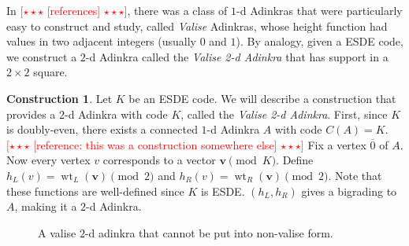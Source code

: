 \documentclass[12pt,twoside,singlespace]{article}
\numberwithin{equation}{section}
\theoremstyle{definition}
\newtheorem{construction}[equation]{Construction}
\newcommand{\on}{\operatorname}
\newcommand{\wt}{\on{wt}}
\newcommand{\com}[1]{\textcolor{red}{$[\star \star \star$ #1 $\star \star \star]$}}
\renewcommand{\vec}[1]{\mathbf{#1}}
\begin{document}
In \com{[references]}, there was a class of $1$-d Adinkras that were particularly easy to construct and study, called {\em Valise} Adinkras, whose height function had values in two adjacent integers (usually $0$ and $1$).  By analogy, given a ESDE code, we construct a $2$-d Adinkra called the {\em Valise 2-d Adinkra} that has support in a $2\times 2$ square.


\begin{construction}
\label{cons:valise}
Let $K$ be an ESDE code.  We will describe a construction that provides a $2$-d Adinkra with code $K$, called the {\em Valise 2-d Adinkra}. First, since $K$ is doubly-even, there exists a connected $1$-d Adinkra $A$ with code $C(A) = K$. \com{ [reference: this was a construction somewhere else]} Fix a vertex $\overline{0}$ of $A$. Now every vertex $v$ corresponds to a vector $\vec{v} \pmod{K}$. Define $h_L(v) = \wt_L(\vec{v}) \pmod{2}$ and $h_R(v) = \wt_R(\vec{v}) \pmod{2}$. Note that these functions are well-defined since $K$ is ESDE. $(h_L, h_R)$ gives a bigrading to $A$, making it a $2$-d Adinkra. %
\end{construction}

\begin{figure}[htb]
\begin{center}

\caption{A valise $2$-d adinkra that cannot be put into non-valise form.\label{fig:tight valise}}
\end{center}
\end{figure}
\end{document}
